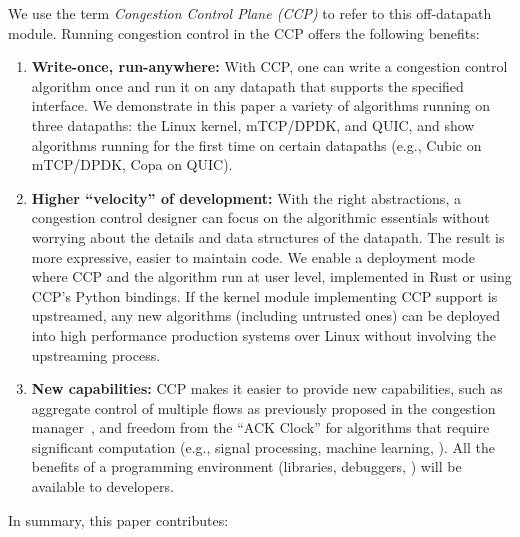 We use the term {\em Congestion Control Plane (CCP)} to refer to this off-datapath module. Running congestion control in the CCP offers the following benefits:
\begin{enumerate}
    \item {\bf Write-once, run-anywhere:} With CCP, one can write a congestion control algorithm once and run it on any datapath that supports the specified interface. 
    We demonstrate in this paper a variety of algorithms running on three datapaths: the Linux kernel, mTCP/DPDK, and QUIC, and show algorithms running for the first time on certain datapaths (e.g., Cubic on mTCP/DPDK, Copa on QUIC).
    \item {\bf Higher ``velocity'' of development:} With the right abstractions,
      a congestion control designer can focus on the algorithmic essentials
      without worrying about the details and data structures of the
      datapath. 
    The result is more expressive, easier to maintain code. We
      enable a deployment mode where CCP and the algorithm run at user level,
      implemented in Rust or using CCP's Python bindings. 
    If the kernel module implementing CCP support is upstreamed, any new algorithms
      (including untrusted ones) can be deployed into high performance
      production systems over Linux without involving the upstreaming process.

    \item {\bf New capabilities:} CCP makes it easier to provide new
      capabilities, such as aggregate control of multiple flows as previously
      proposed in the congestion manager~\cite{cm}, and freedom from the ``ACK
      Clock'' for algorithms that require significant computation (e.g., signal
      processing, machine learning, \etc). 
    All the benefits of a \userspace
      programming environment (libraries, debuggers, \etc) will be available to
      developers.
\end{enumerate}

\vspace{0.1in}
In summary, this paper contributes:


